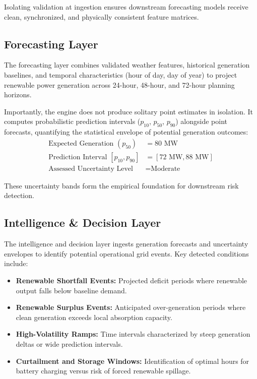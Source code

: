 Isolating validation at ingestion ensures downstream forecasting models receive clean, synchronized, and physically consistent feature matrices.

\subsection{Forecasting Layer}
\label{subsec:forecasting_layer}

The forecasting layer combines validated weather features, historical generation baselines, and temporal characteristics (hour of day, day of year) to project renewable power generation across 24-hour, 48-hour, and 72-hour planning horizons.

Importantly, the engine does not produce solitary point estimates in isolation. It computes probabilistic prediction intervals ($p_{10}$, $p_{50}$, $p_{90}$) alongside point forecasts, quantifying the statistical envelope of potential generation outcomes:
\begin{align*}
    \text{Expected Generation } (p_{50}) &= 80\text{ MW} \\
    \text{Prediction Interval } [p_{10}, p_{90}] &= [72\text{ MW}, 88\text{ MW}] \\
    \text{Assessed Uncertainty Level} &= \text{Moderate}
\end{align*}

These uncertainty bands form the empirical foundation for downstream risk detection.

\subsection{Intelligence \& Decision Layer}
\label{subsec:intelligence_decision}

The intelligence and decision layer ingests generation forecasts and uncertainty envelopes to identify potential operational grid events. Key detected conditions include:
\begin{itemize}[leftmargin=1.8em, itemsep=0.2em]
    \item \textbf{Renewable Shortfall Events:} Projected deficit periods where renewable output falls below baseline demand.
    \item \textbf{Renewable Surplus Events:} Anticipated over-generation periods where clean generation exceeds local absorption capacity.
    \item \textbf{High-Volatility Ramps:} Time intervals characterized by steep generation deltas or wide prediction intervals.
    \item \textbf{Curtailment and Storage Windows:} Identification of optimal hours for battery charging versus risk of forced renewable spillage.
\end{itemize}


